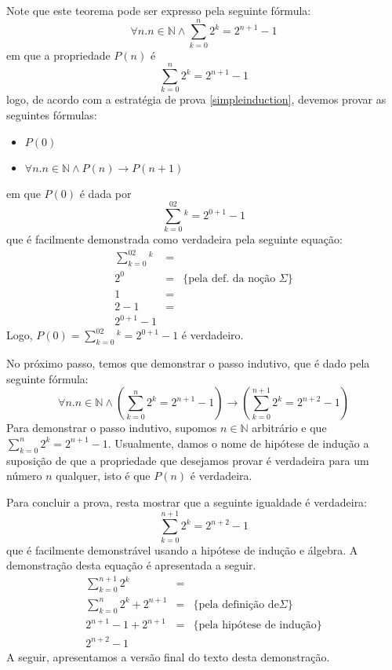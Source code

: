 \begin{Commentary}
Note que este teorema pode ser expresso pela seguinte fórmula:
\[
\forall n. n\in\mathbb{N} \land \sum_{k = 0}^n2^k = 2^{n+1} - 1
\]
em que a propriedade $P(n)$ é
\[
\sum_{k = 0}^n2^k = 2^{n+1} - 1
\]
logo, de acordo com a estratégia de prova \ref{simpleinduction},
devemos provar as seguintes fórmulas:
\begin{itemize}
    \item $P(0)$
    \item $\forall n. n\in\mathbb{N}\land P(n) \to P(n+1)$
\end{itemize}
em que $P(0)$ é dada por
\[
\sum_{k = 0}^02^k = 2^{0+1} - 1
\]
que é facilmente demonstrada como verdadeira pela seguinte equação:
\[
\begin{array}{lcl}
\sum_{k = 0}^02^k & = \\
2^0                       & = & \{\text{pela def. da noção }\Sigma\}\\
1                          & = &\\
2 - 1                    & = & \\
2^{0 + 1} - 1
\end{array}
\]
Logo, $P(0) = \sum_{k = 0}^02^k = 2^{0+1} - 1$ é verdadeiro.

No próximo passo, temos que demonstrar o passo indutivo, que é dado
pela seguinte fórmula:
\[
\forall n. n\in\mathbb{N}\land \left(\sum_{k = 0}^n 2^k = 2^{n + 1} -
  1\right) \to \left(\sum_{k = 0}^{n + 1} 2^k = 2^{n + 2} -
  1\right)
\]
Para demonstrar o passo indutivo, supomos $n\in\mathbb{N}$ arbitrário
e que $\sum_{k = 0}^n 2^k = 2^{n + 1}  - 1$. Usualmente, damos o nome
de hipótese de indução a suposição de que a propriedade que desejamos
provar é verdadeira para um número $n$ qualquer, isto é que $P(n)$ é
verdadeira.

Para concluir a prova, resta mostrar que a seguinte igualdade é
verdadeira:
\[
\sum_{k = 0}^{n+1} 2^k = 2^{n + 2} - 1
\]
que é facilmente demonstrável usando a hipótese de indução e
álgebra. A demonstração desta equação é apresentada a seguir.
\[
\begin{array}{lcl}
\sum_{k = 0}^{n + 1}2^k & = & \\
\sum_{k = 0}^{n}2^k + 2^{n + 1} & = &\{\text{pela definição de
}\Sigma\}\\
2^{n + 1} - 1 + 2^{n+1} & = &\{\text{pela hipótese de indução}\}\\
2^{n+2} -1
\end{array}
\]
A seguir, apresentamos a versão final do texto desta demonstração.
\end{Commentary}
